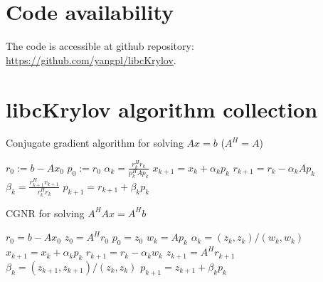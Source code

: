 \documentclass[10pt]{article}
\begin{document}





\section*{Code availability}

The code is accessible at github repository: \url{https://github.com/yangpl/libcKrylov}.


\appendix

\section{libcKrylov algorithm collection}

\begin{algorithm}[H]
  \caption{Conjugate gradient algorithm for solving $Ax=b$ ($A^H=A$) \citep{Shewchuk_1994_ICG}}\label{alg:CG}
  \begin{algorithmic}[1]
  \State $r_0:=b-A x_0$
  \State $p_0:=r_0$
    \State $\alpha_k=\frac{r_k^H r_k}{p_k^H Ap_k}$
    \State $x_{k+1}=x_k + \alpha_k p_k$
    \State $r_{k+1}=r_k - \alpha_k A p_k$
    \State $\beta_{k} = \frac{r_{k+1}^H r_{k+1}}{r_k^H r_k}$\;
    \State $p_{k+1}=r_{k+1} + \beta_k p_k$\;
    \EndFor
  \end{algorithmic}
\end{algorithm}

\begin{algorithm}[H]
  \caption{CGNR for solving $A^H Ax=A^H b$ \citep[algorithm 8.4]{Saad_2003_IMS}}
  \begin{algorithmic}[1]
    \State $r_0=b-Ax_0$
    \State $z_0 = A^H r_0$
    \State $p_0=z_0$
    \State $w_k=Ap_k$
    \State $\alpha_k = (z_k,z_k)/(w_k,w_k)$
    \State $x_{k+1} = x_k + \alpha_k  p_k$
    \State $r_{k+1} = r_k-\alpha_k w_k$
    \State $z_{k+1}=A^H r_{k+1}$
    \State $\beta_k = (z_{k+1},z_{k+1})/(z_k,z_k)$
    \State $p_{k+1}=z_{k+1}+\beta_k p_k$
    \EndFor
  \end{algorithmic}
\end{algorithm}
\end{document}
